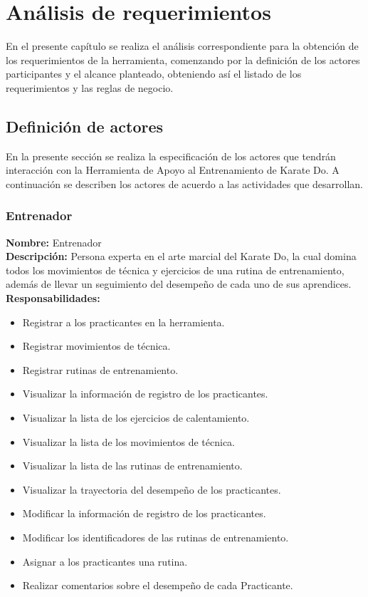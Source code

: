 \chapter{Análisis de requerimientos}
En el presente capítulo se realiza el análisis correspondiente para la obtención de los requerimientos de la herramienta, comenzando por la definición de los actores participantes y el alcance planteado, obteniendo así el listado de los requerimientos y las reglas de negocio.
\section{Definición de actores}
En la presente sección se realiza la especificación de los actores que tendrán interacción con la Herramienta de Apoyo al Entrenamiento de Karate Do. A continuación se describen los actores de acuerdo a las actividades que desarrollan.
\subsection{Entrenador}
\label{act:Entrenador} 
\textbf{\textcolor[rgb]{0, 0, 0.545098}{Nombre:}} Entrenador \\

\textbf{\textcolor[rgb]{0, 0, 0.545098}{Descripción:}} Persona experta en el arte marcial del Karate Do, la cual domina todos los movimientos de técnica y ejercicios de una rutina de entrenamiento, además de llevar un seguimiento del desempeño de cada uno de sus aprendices. \\

\textbf{\textcolor[rgb]{0, 0, 0.545098}{Responsabilidades:}}
\begin{itemize}
	\item Registrar a los practicantes en la herramienta.
	\item Registrar movimientos de técnica. 
	\item Registrar rutinas de entrenamiento.
	\item Visualizar la información de registro de los practicantes.
	\item Visualizar la lista de los ejercicios de calentamiento.
	\item Visualizar la lista de los movimientos de técnica.
	\item Visualizar la lista de las rutinas de entrenamiento.
	\item Visualizar la trayectoria del desempeño de los practicantes.
	\item Modificar la información de registro de los practicantes.
	\item Modificar los identificadores de las rutinas de entrenamiento.
	\item Asignar a los practicantes una rutina.
	\item Realizar comentarios sobre el desempeño de cada Practicante.
\end{itemize}
\vspace{1em}

